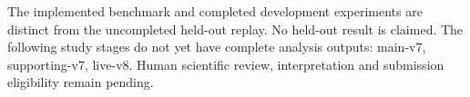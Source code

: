 The implemented benchmark and completed development experiments are distinct from the uncompleted held-out replay. No held-out result is claimed. The following study stages do not yet have complete analysis outputs: main-v7, supporting-v7, live-v8. Human scientific review, interpretation and submission eligibility remain pending.
